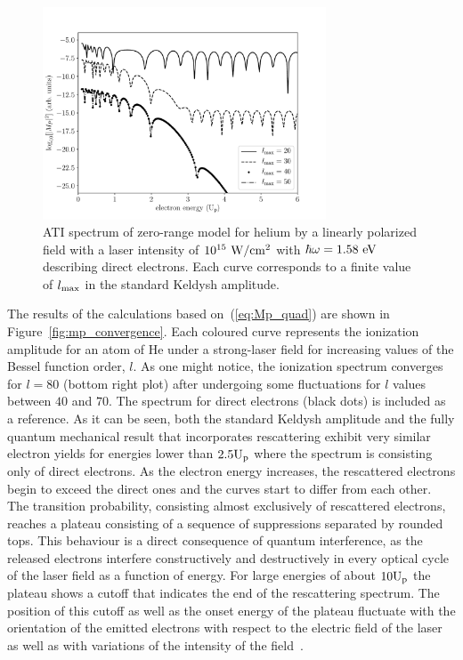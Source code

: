 \begin{figure}
  \centering
  \includegraphics[width=0.75\textwidth]{figures/ch_ATI_SFA/He/l20304050Keldysh.pdf}
\caption{ATI spectrum of zero-range model for helium by a linearly
  polarized field with a laser intensity of $10^{15}\ \rm{W/cm^{2}}$
  with $\hbar\omega = 1.58\ \rm{eV}$ describing direct electrons. Each
  curve corresponds to a finite value of $l_{\rm{max}}$ in the
  standard Keldysh amplitude.}
\label{fig:keldysh_convergence}
\end{figure}

The results of the calculations based on~(\ref{eq:Mp_quad}) are shown
in Figure~\ref{fig:mp_convergence}. Each coloured curve represents the
ionization amplitude for an atom of He under a strong-laser field for
increasing values of the Bessel function order, $l$. As one might
notice, the ionization spectrum converges for $l=80$ (bottom right
plot) after undergoing some fluctuations for $l$ values between $40$
and $70$. The spectrum for direct electrons (black dots) is included
as a reference. As it can be seen, both the standard Keldysh amplitude
and the fully quantum mechanical result that incorporates rescattering
exhibit very similar electron yields for energies lower than
$2.5\rm{U_{p}}$ where the spectrum is consisting only of direct
electrons. As the electron energy increases, the rescattered electrons
begin to exceed the direct ones and the curves start to differ from
each other. The transition probability, consisting almost exclusively
of rescattered electrons, reaches a plateau consisting of a sequence
of suppressions separated by rounded tops. This behaviour is a direct
consequence of quantum interference, as the released electrons
interfere constructively and destructively in every optical cycle of
the laser field as a function of energy. For large energies of about
$10\rm{U_{p}}$ the plateau shows a cutoff that indicates the end of
the rescattering spectrum. The position of this cutoff as well as the
onset energy of the plateau fluctuate with the orientation of the
emitted electrons with respect to the electric field of the laser as
well as with variations of the intensity of the
field~\cite{Kopold_1997sfa,Paulus_1994plateau,Paulus_1994plateau_classical}.


